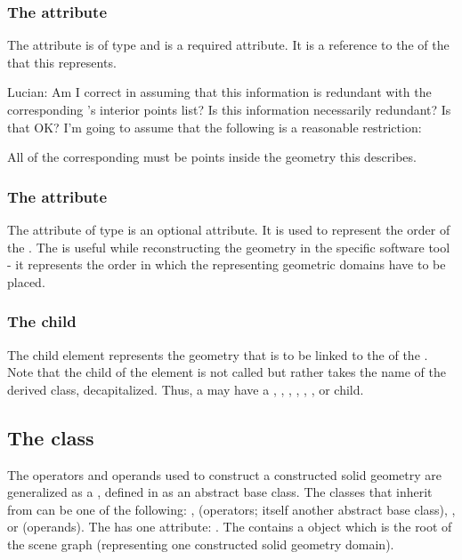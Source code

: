 \subsubsection{The  attribute}
The  attribute is of type  and is a required attribute. It is a reference to the  of the \Domain that this \CSGObject represents.

{\color{red} Lucian: \notice Am I correct in assuming that this information is redundant with the corresponding \Domain's interior points list?  Is this information necessarily redundant?  Is that OK?  I'm going to assume that the following is a reasonable restriction:}

All \InteriorPoints of the corresponding \Domain must be points inside the geometry this \CSGObject describes.

\subsubsection{The  attribute}
The  attribute of type  is an optional attribute. It is used to represent the order of the \CSGObject. The  is useful while reconstructing the geometry in the specific software tool - it represents the order in which the \CSGObjects representing geometric domains have to be placed.

\subsubsection{The  child}

The child  element represents the geometry that is to be linked to the  of the \CSGObject.  Note that the child of the \CSGObject element is not called  but rather takes the name of the derived class, decapitalized.  Thus, a \CSGObject may have a , , , , , , or  child.


\subsection{The  class}
\label{CSGNode-class}
The operators and operands used to construct a constructed solid geometry are generalized as a \CSGNode, defined in  as an abstract base class. The classes that inherit from \CSGNode can be one of the following: \CSGSetOperator, \CSGTransformation (operators; itself another abstract base class), \CSGPrimitive, or \CSGPseudoPrimitive (operands). The \CSGNode has one attribute: . The \CSGObject contains a \CSGNode object which is the root of the \CSGObject scene graph (representing one constructed solid geometry domain).

